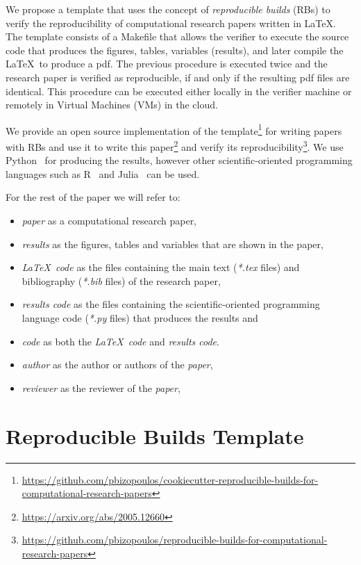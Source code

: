 \documentclass[journal]{IEEEtran}
\begin{document}
We propose a template that uses the concept of \textit{reproducible builds} (RBs) to verify the reproducibility of computational research papers written in \LaTeX.
The template consists of a Makefile that allows the verifier to execute the source code that produces the figures, tables, variables (results), and later compile the \LaTeX\ to produce a pdf.
The previous procedure is executed twice and the research paper is verified as reproducible, if and only if the resulting pdf files are identical.
This procedure can be executed either locally in the verifier machine or remotely in Virtual Machines (VMs) in the cloud.

We provide an open source implementation of the template\footnote{\url{https://github.com/pbizopoulos/cookiecutter-reproducible-builds-for-computational-research-papers}} for writing papers with RBs and use it to write this paper\footnote{\url{https://arxiv.org/abs/2005.12660}} and verify its reproducibility\footnote{\url{https://github.com/pbizopoulos/reproducible-builds-for-computational-research-papers}}.
We use Python~\cite{van2007python} for producing the results, however other scientific-oriented programming languages such as R~\cite{ihaka1996r} and Julia~\cite{bezanson2017julia} can be used.

For the rest of the paper we will refer to:
\begin{itemize}
	\item \textit{paper} as a computational research paper,
	\item \textit{results} as the figures, tables and variables that are shown in the paper,
	\item \textit{\LaTeX\ code} as the files containing the main text (\textit{*.tex} files) and bibliography (\textit{*.bib} files) of the research paper,
	\item \textit{results code} as the files containing the scientific-oriented programming language code (\textit{*.py} files) that produces the results and
	\item \textit{code} as both the \textit{\LaTeX\ code} and \textit{results code}.
	\item \textit{author} as the author or authors of the \textit{paper},
	\item \textit{reviewer} as the reviewer of the \textit{paper},
\end{itemize}

\section{Reproducible Builds Template}
\end{document}
